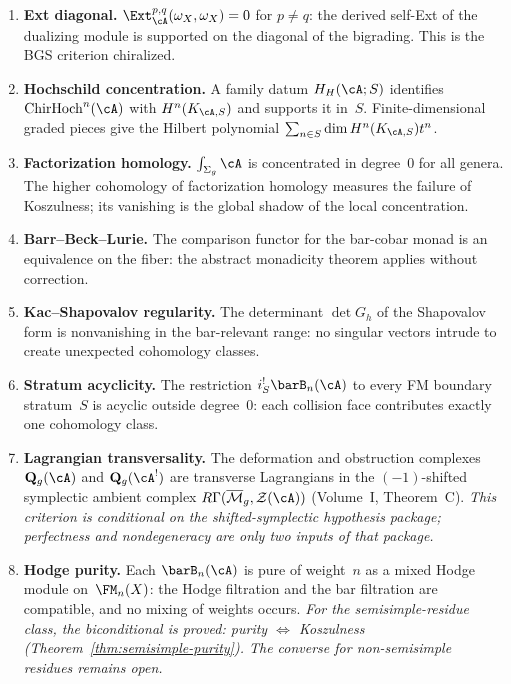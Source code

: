 \begin{theorem}
\begin{enumerate}[label=\textup{(\roman*)}]
\item \textbf{Ext diagonal.}
 $\Ext^{p,q}_\cA(\omega_X, \omega_X) = 0$ for $p \neq q$: the
 derived self-Ext of the dualizing module is supported on the diagonal
 of the bigrading. This is the BGS criterion chiralized.

\item \textbf{Hochschild concentration.}
 A family datum $H_H(\cA;S)$ identifies
 $\mathrm{ChirHoch}^n(\cA)$ with $H^n(K_{\cA,S})$ and supports it
 in~$S$.  Finite-dimensional graded pieces give the Hilbert
 polynomial $\sum_{n\in S}\dim H^n(K_{\cA,S})t^n$.

\item \textbf{Factorization homology.}
 $\int_{\Sigma_g} \cA$ is concentrated in degree~$0$ for all genera.
 The higher cohomology of factorization homology measures the failure
 of Koszulness; its vanishing is the global shadow of the local
 concentration.

\item \textbf{Barr--Beck--Lurie.}
 The comparison functor for the bar-cobar monad is an equivalence on
 the fiber: the abstract monadicity theorem applies without
 correction.

\item \textbf{Kac--Shapovalov regularity.}
 The determinant $\det G_h$ of the Shapovalov form is nonvanishing in
 the bar-relevant range: no singular vectors intrude to create
 unexpected cohomology classes.

\item \textbf{Stratum acyclicity.}
 The restriction $i_S^!\barB_n(\cA)$ to every FM boundary stratum~$S$
 is acyclic outside degree~$0$: each collision face contributes
 exactly one cohomology class.

\item \textbf{Lagrangian transversality.}
 The deformation and obstruction complexes $\mathbf{Q}_g(\cA)$ and
 $\mathbf{Q}_g(\cA^!)$ are transverse Lagrangians in the
 $(-1)$-shifted symplectic ambient complex
 $R\Gamma(\overline{\mathcal{M}}_g, \mathcal{Z}(\cA))$
 (Volume~I, Theorem~C).
 \emph{This criterion is conditional on the shifted-symplectic
 hypothesis package; perfectness and nondegeneracy are only two
 inputs of that package.}

\item \textbf{Hodge purity.}
 Each $\barB_n(\cA)$ is pure of weight~$n$ as a mixed Hodge module
 on~$\FM_n(X)$: the Hodge filtration and the bar filtration are
 compatible, and no mixing of weights occurs.
 \emph{For the semisimple-residue class,
 the biconditional is proved\textup{:}
 purity $\Leftrightarrow$ Koszulness
 \textup{(}Theorem~\textup{\ref{thm:semisimple-purity}).}
 The converse for non-semisimple residues remains open.}
\end{enumerate}
\end{theorem}

